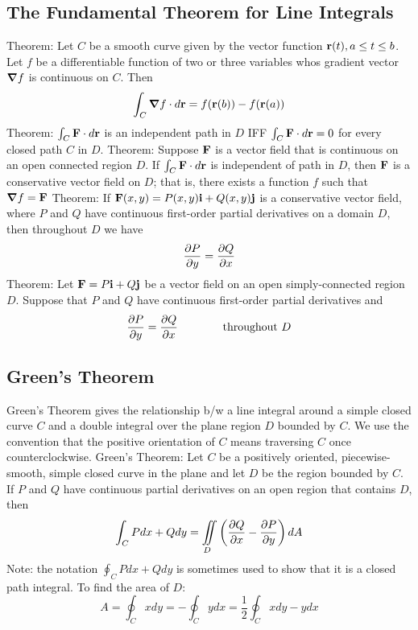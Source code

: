\documentclass{article}
\begin{document}
    \begin{multicols}{2}

    \subsection{The Fundamental Theorem for Line Integrals}
    \begin{outline}
        \1 Theorem: Let $C$ be a smooth curve given by the vector function \(\vb r(t),a\leq t\leq b\). Let $f$ be a differentiable function of two or three variables whos gradient vector \(\grad f\) is continuous on $C$. Then \[\int_C\grad f\cdot d\vb r=f(\vb r(b))-f(\vb r(a))\]
        \1 Theorem: \(\int_C\vb F\cdot d\vb r\) is an independent path in $D$ IFF \(\int_C\vb F\cdot d\vb r=0\) for every closed path $C$ in $D$. 
        \1 Theorem: Suppose \(\vb F\) is a vector field that is continuous on an open connected region $D$. If \(\int_C\vb F\cdot d\vb r\) is independent of path in $D$, then \(\vb F\) is a conservative vector field on $D$; that is, there exists a function $f$ such that \(\grad f=\vb F\)
        \1 Theorem: If \(\vb F(x,y)=P(x,y)\vb i+Q(x,y)\vb j\) is a conservative vector field, where $P$ and $Q$ have continuous first-order partial derivatives on a domain $D$, then throughout $D$ we have \[\pdv{P}{y}=\pdv{Q}{x}\]
        \1 Theorem: Let \(\vb F=P\vb i+Q\vb j\) be a vector field on an open simply-connected region $D$. Suppose that \(P\) and $Q$ have continuous first-order partial derivatives and \[\pdv{P}{y}=\pdv{Q}{x}\qquad\qquad\text{throughout }D\]
    \end{outline}    \end{multicols}
    \subsection{Green's Theorem}
    \begin{outline}
        \1 Green's Theorem gives the relationship b/w a line integral around a simple closed curve $C$ and a double integral over the plane region $D$ bounded by $C$. 
        \1 We use the convention that the positive orientation of $C$ means traversing $C$ once counterclockwise. 
        \1 Green's Theorem: Let $C$ be a positively oriented, piecewise-smooth, simple closed curve in the plane and let $D$ be the region bounded by $C$. If $P$ and $Q$ have continuous partial derivatives on an open region that contains $D$, then \[\int_CPdx+Qdy=\iint\limits_D\left(\pdv{Q}{x}-\pdv{P}{y}\right)dA\]
            \2 Note: the notation \(\oint_CPdx+Qdy\) is sometimes used to show that it is a closed path integral. 
        \1 To find the area of $D$: \[A=\oint_Cxdy=-\oint_Cydx=\dfrac{1}{2}\oint_Cxdy-ydx\]

    \end{outline}
\end{document}
